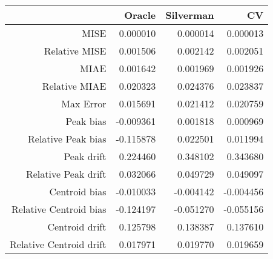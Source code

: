 \begin{tabular}{rrrr}
  \hline
 & Oracle & Silverman & CV \\ 
  \hline
MISE & 0.000010 & 0.000014 & 0.000013 \\ 
  Relative MISE & 0.001506 & 0.002142 & 0.002051 \\ 
  MIAE & 0.001642 & 0.001969 & 0.001926 \\ 
  Relative MIAE & 0.020323 & 0.024376 & 0.023837 \\ 
  Max Error & 0.015691 & 0.021412 & 0.020759 \\ 
  Peak bias & -0.009361 & 0.001818 & 0.000969 \\ 
  Relative Peak bias & -0.115878 & 0.022501 & 0.011994 \\ 
  Peak drift & 0.224460 & 0.348102 & 0.343680 \\ 
  Relative Peak drift & 0.032066 & 0.049729 & 0.049097 \\ 
  Centroid bias & -0.010033 & -0.004142 & -0.004456 \\ 
  Relative Centroid bias & -0.124197 & -0.051270 & -0.055156 \\ 
  Centroid drift & 0.125798 & 0.138387 & 0.137610 \\ 
  Relative Centroid drift & 0.017971 & 0.019770 & 0.019659 \\ 
   \hline
\end{tabular}
